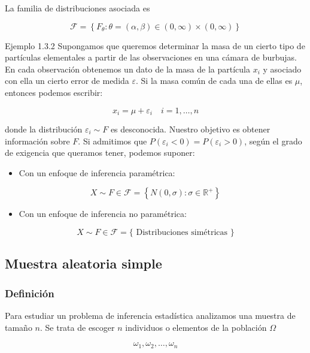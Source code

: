 \documentclass[
]{article}
\providecommand{\tightlist}{%
  \setlength{\itemsep}{0pt}\setlength{\parskip}{0pt}}
\begin{document}
La familia de distribuciones asociada es

\[
\mathcal{F}=\left\{F_{\theta}: \theta=(\alpha, \beta) \in(0, \infty) \times(0, \infty)\right\}
\]

Ejemplo 1.3.2 Supongamos que queremos determinar la masa de un cierto tipo de partículas elementales a partir de las observaciones en una cámara de burbujas. En cada observación obtenemos un dato de la masa de la partícula \(x_{i}\) y asociado con ella un cierto error de medida \(\varepsilon\). Si la masa común de cada una de ellas es \(\mu\), entonces podemos escribir:

\[
x_{i}=\mu+\varepsilon_{i} \quad i=1, \ldots, n
\]

donde la distribución \(\varepsilon_{i} \sim F\) es desconocida. Nuestro objetivo es obtener información sobre \(F\).
Si admitimos que \(P\left(\varepsilon_{i}<0\right)=P\left(\varepsilon_{i}>0\right)\), según el grado de exigencia que queramos tener, podemos suponer:

\begin{itemize}
\tightlist
\item
  Con un enfoque de inferencia paramétrica:
\end{itemize}

\[
X \sim F \in \mathcal{F}=\left\{N(0, \sigma): \sigma \in \mathbb{R}^{+}\right\}
\]

\begin{itemize}
\tightlist
\item
  Con un enfoque de inferencia no paramétrica:
\end{itemize}

\[
X \sim F \in \mathcal{F}=\{\text { Distribuciones simétricas }\}
\]

\subsection{Muestra aleatoria simple}\label{muestra-aleatoria-simple}

\subsubsection{Definición}\label{definiciuxf3n}

Para estudiar un problema de inferencia estadística analizamos una muestra de tamaño \(n\). Se trata de escoger \(n\) individuos o elementos de la población \(\Omega\)

\[
\omega_{1}, \omega_{2}, \ldots, \omega_{n}
\]
\end{document}
